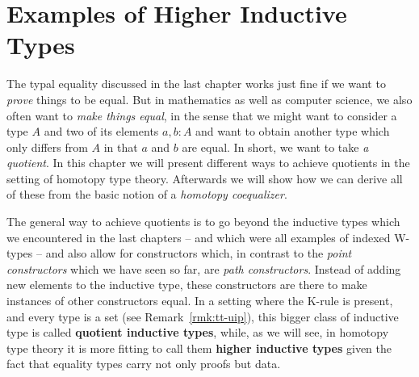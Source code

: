 \section{Examples of Higher Inductive Types}

The typal equality discussed in the last chapter works just fine if we want
to \emph{prove} things to be equal.
But in mathematics as well as computer science, we also often want to
\emph{make things equal}, in the sense that we might want to consider a type
$A$ and two of its elements $a, b : A$ and want to obtain
another type which only differs from $A$ in that $a$ and $b$ are equal.
In short, we want to take \emph{a quotient}.
In this chapter we will present different ways to achieve quotients in the setting
of homotopy type theory.
Afterwards we will show how we can derive all of these from the basic notion
of a \emph{homotopy coequalizer}.

The general way to achieve quotients is to go beyond the inductive types
which we encountered in the last chapters -- and which were all examples of
indexed W-types --
and also allow for constructors which,
in contrast to the \emph{point constructors} which we have seen so far,
are \emph{path constructors}.
Instead of adding new elements to the inductive type,
these constructors are there to make instances of other constructors equal.
In a setting where the K-rule is present, and every type is a set (see Remark~\ref{rmk:tt-uip}),
this bigger class of inductive type is called \textbf{quotient inductive types},
while, as we will see, in homotopy type theory it is more
fitting to call them \textbf{higher inductive types} given the fact
that equality types carry not only proofs but data.

